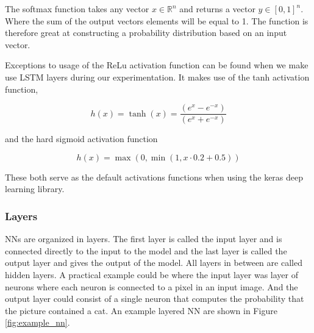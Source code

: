 The softmax function takes any vector $x \in \mathbb{R}^n$ and returns a vector
$y \in [0, 1]^n$. Where the sum of the output vectors elements will be equal to
1. The function is therefore great at constructing a probability distribution
based on an input vector.

Exceptions to usage of the \gls{ReLu} activation function can be found when
we make use \gls{LSTM} layers during our experimentation. It makes use of the
tanh activation function,

\begin{equation}\label{eq:tanh}
h(x) = \tanh(x) = \frac{(e^x - e^{-x})}{(e^x + e^{-x})}
\end{equation}

and the hard sigmoid activation function

\begin{equation}\label{eq:h_sig}
h(x) = \max(0, \min(1, x \cdot 0.2 + 0.5))
\end{equation}

These both serve as the default activations functions when using the keras deep
learning library. \cite{chollet2015keras}

\subsubsection{Layers} \label{subsubsec:layers}

\glspl{NN} are organized in layers. The first layer is called the input layer
and is connected directly to the input to the model and the last layer is called
the output layer and gives the output of the model. All layers in between
are called hidden layers. A practical example could be where the input layer
was layer of neurons where each neuron is connected to a pixel in an input
image. And the output layer could consist of a single neuron that computes the
probability that the picture contained a cat. An example layered \gls{NN} are
shown in Figure \ref{fig:example_nn}.

